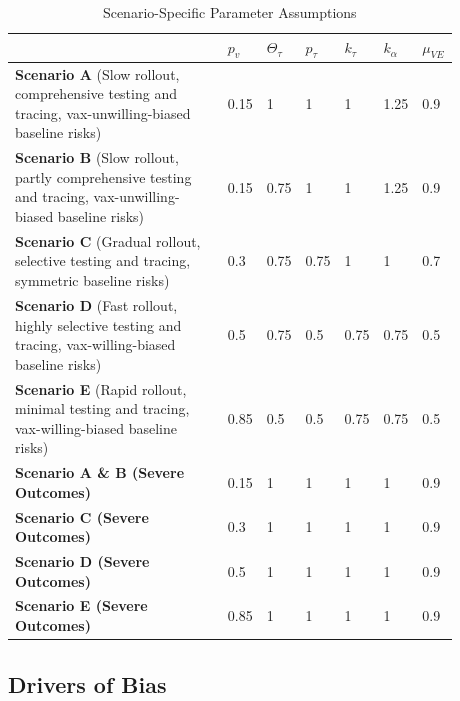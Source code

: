 \documentclass[12pt]{article}
\begin{document}
\begin{table}[H]
	\begin{center}
		\caption{Scenario-Specific Parameter Assumptions}
		\begin{tabular}{||p{0.58\linewidth}||p{0.05\linewidth}|p{0.05\linewidth}|p{0.05\linewidth}|p{0.05\linewidth}|p{0.05\linewidth}|p{0.05\linewidth}||}
			\hline \hline
			& $p_v$ & $\Theta_{\tau}$ & $p_\tau$ & $k_\tau$ & $k_\alpha$ & $\mu_{VE}$ \\
			\hline \hline
			\textbf{Scenario A} (Slow rollout, comprehensive testing and tracing, vax-unwilling-biased baseline risks) & 0.15 & 1 & 1 & 1 & 1.25 & 0.9 \\
			\hline
			\textbf{Scenario B} (Slow rollout, partly comprehensive testing and tracing, vax-unwilling-biased baseline risks) & 0.15 & 0.75 & 1 & 1 & 1.25 & 0.9 \\
			\hline
			\textbf{Scenario C} (Gradual rollout, selective testing and tracing, symmetric baseline risks) & 0.3 & 0.75 & 0.75 & 1 & 1 & 0.7 \\
			\hline
			\textbf{Scenario D} (Fast rollout, highly selective testing and tracing, vax-willing-biased baseline risks) & 0.5 & 0.75 & 0.5 & 0.75 & 0.75 & 0.5\\
			\hline
			\textbf{Scenario E} (Rapid rollout, minimal testing and tracing, vax-willing-biased baseline risks) & 0.85 & 0.5 & 0.5 & 0.75 & 0.75 & 0.5 \\
			\hline
			\textbf{Scenario A \& B (Severe Outcomes)} & 0.15 & 1 & 1 & 1 & 1 & 0.9 \\
			\hline
			\textbf{Scenario C (Severe Outcomes)} & 0.3 & 1 & 1 & 1 & 1 & 0.9 \\
			\hline
			\textbf{Scenario D (Severe Outcomes)} & 0.5 & 1 & 1 & 1 & 1 & 0.9 \\
			\hline
			\textbf{Scenario E (Severe Outcomes)}  & 0.85 & 1 & 1 & 1 & 1 & 0.9 \\
			\hline \hline
		\end{tabular}
	\end{center}
\end{table}

\subsection{Drivers of Bias} 
\end{document}
